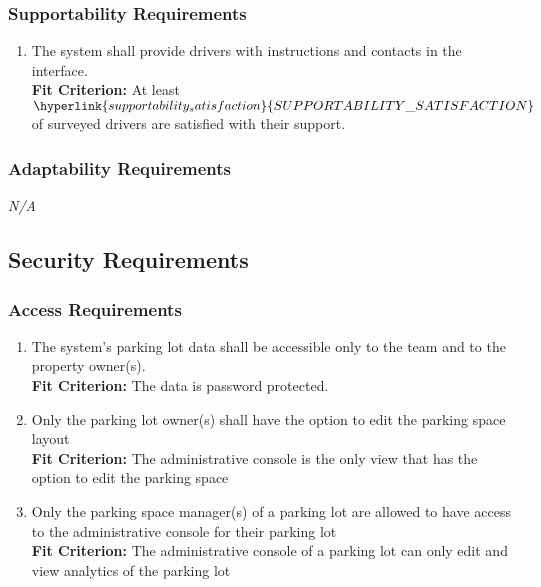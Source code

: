 \documentclass[12pt,letterpaper]{article}
\begin{document}
\subsubsection{Supportability Requirements}
\begin{enumerate}[resume*] 
    \item The system shall provide drivers with instructions and contacts in the
    interface.\\
    \textbf{Fit Criterion:} At least
    $\hyperlink{supportability_satisfaction}{SUPPORTABILITY\_SATISFACTION}$ of
    surveyed drivers are satisfied with their support.
\end{enumerate}

\subsubsection{Adaptability Requirements}
\noindent \emph{N/A}

\subsection{Security Requirements}
\subsubsection{Access Requirements}
\begin{enumerate}[{SR}1.] 
    \item The system's parking lot data shall be accessible only to the team and
    to the property owner(s).\label{pocnf5} \\
    \textbf{Fit Criterion:} The data is password protected.
    \item Only the parking lot owner(s) shall have the option to edit the
    parking space layout \label{asr2} \\
    \textbf{Fit Criterion:} The administrative console is the only view that has
    the option to edit the parking space
    \item Only the parking space manager(s) of a parking lot are allowed to have
    access to the administrative console for their parking lot \label{asr3}\\
    \textbf{Fit Criterion:} The administrative console of a parking lot can only
    edit and view analytics of the parking lot
\end{enumerate}
\end{document}
